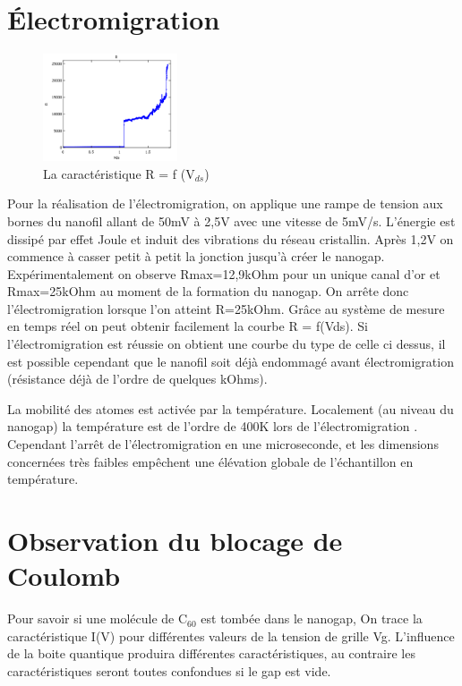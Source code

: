 \section{Électromigration}
\begin{figure}[h]
    \begin{center}
        \includegraphics[width=150px]{Images/Image_Electromigration_1.png}
        \caption{La caractéristique R = f (V$_{ds}$)}
        \label{fig:}
    \end{center}
\end{figure}
Pour la réalisation de l'électromigration, on applique une rampe de tension aux bornes du nanofil allant de 50mV à 2,5V avec une vitesse de 5mV/s.
L'énergie est dissipé par effet Joule et induit des vibrations du réseau cristallin. Après 1,2V  on commence à casser petit à petit la jonction jusqu'à créer le nanogap. Expérimentalement on observe Rmax=12,9kOhm pour un unique canal d'or et Rmax=25kOhm au moment de la formation du nanogap. On arrête donc l'électromigration lorsque l'on atteint R=25kOhm.
Grâce au système de mesure en temps réel on peut obtenir facilement la courbe R = f(Vds). Si l'électromigration est réussie on obtient une courbe du type de celle ci dessus, il est possible cependant que le nanofil soit déjà endommagé avant électromigration (résistance déjà de l'ordre de quelques kOhms). 

La mobilité des atomes est activée par la température. Localement (au niveau du nanogap) la température est de l'ordre de 400K lors de l'électromigration \cite{11}. Cependant l'arrêt de l'électromigration en une microseconde, et les dimensions concernées très faibles empêchent une élévation globale de l'échantillon en température.


\section{Observation du blocage de Coulomb}
Pour savoir si une molécule de C$_{60}$ est tombée dans le nanogap, On trace la caractéristique I(V) pour différentes valeurs de la tension de grille Vg. L'influence de la boite quantique produira différentes caractéristiques, au contraire les caractéristiques seront toutes confondues si le gap est vide.\\


